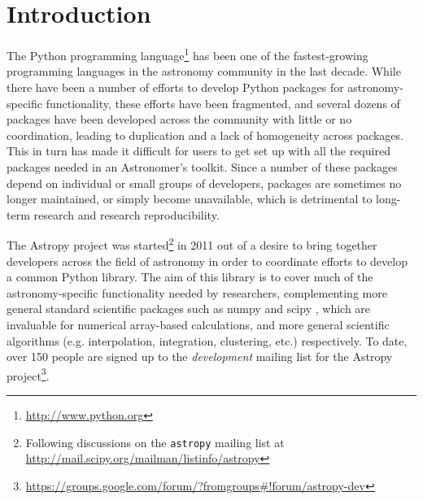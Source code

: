 \documentclass[traditabstract]{aa}
\begin{document}

\maketitle



\section{Introduction}


The Python programming language\footnote{\url{http://www.python.org}} has been
one of the fastest-growing programming languages in the astronomy community in
the last decade. While there have been a number of efforts to develop Python
packages for astronomy-specific functionality, these efforts have been
fragmented, and several dozens of packages have been developed across the
community with little or no coordination, leading to duplication and a lack of
homogeneity across packages. This in turn has made it difficult for users to
get set up with all the required packages needed in an Astronomer's toolkit.
Since a number of these packages depend on individual or small groups of
developers, packages are sometimes no longer maintained, or simply become
unavailable, which is detrimental to long-term research and research
reproducibility.

The Astropy project was started\footnote{Following discussions on
the \texttt{astropy} mailing list at
\url{http://mail.scipy.org/mailman/listinfo/astropy}} in 2011 out of a desire
to bring together developers across the field of astronomy in order to
coordinate efforts to develop a common Python library. The aim of this library
is to cover much of the astronomy-specific functionality needed by
researchers, complementing more general standard scientific packages such as
\gls{numpy} and \gls{scipy} ,
which are invaluable for numerical array-based calculations, and more general
scientific algorithms (e.g. interpolation, integration, clustering, etc.)
respectively. To date, over 150 people are signed up to the
\textit{development} mailing list for the Astropy project\footnote{
\url{https://groups.google.com/forum/?fromgroups\#!forum/astropy-dev}}.
\end{document}
